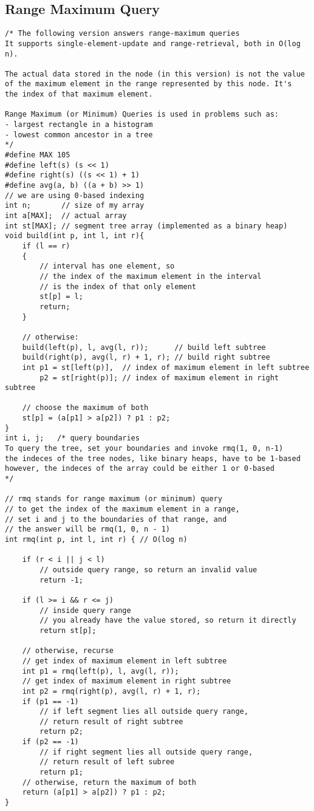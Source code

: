 \documentclass[12pt]{book}
\begin{document}
\subsection{Range Maximum Query}
\begin{verbatim}
/* The following version answers range-maximum queries
It supports single-element-update and range-retrieval, both in O(log n).

The actual data stored in the node (in this version) is not the value
of the maximum element in the range represented by this node. It's
the index of that maximum element.

Range Maximum (or Minimum) Queries is used in problems such as:
- largest rectangle in a histogram
- lowest common ancestor in a tree
*/
#define MAX 105
#define left(s) (s << 1)
#define right(s) ((s << 1) + 1)
#define avg(a, b) ((a + b) >> 1)
// we are using 0-based indexing
int n;       // size of my array
int a[MAX];  // actual array
int st[MAX]; // segment tree array (implemented as a binary heap)
void build(int p, int l, int r){
	if (l == r)
	{
		// interval has one element, so
		// the index of the maximum element in the interval
		// is the index of that only element
		st[p] = l;
		return;
	}
	
	// otherwise:
	build(left(p), l, avg(l, r));      // build left subtree
	build(right(p), avg(l, r) + 1, r); // build right subtree
	int p1 = st[left(p)],  // index of maximum element in left subtree
	    p2 = st[right(p)]; // index of maximum element in right subtree
	
	// choose the maximum of both
	st[p] = (a[p1] > a[p2]) ? p1 : p2;
}
int i, j;	/* query boundaries
To query the tree, set your boundaries and invoke rmq(1, 0, n-1)
the indeces of the tree nodes, like binary heaps, have to be 1-based
however, the indeces of the array could be either 1 or 0-based
*/

// rmq stands for range maximum (or minimum) query
// to get the index of the maximum element in a range,
// set i and j to the boundaries of that range, and
// the answer will be rmq(1, 0, n - 1)
int rmq(int p, int l, int r) { // O(log n)

	if (r < i || j < l)
		// outside query range, so return an invalid value
		return -1;

	if (l >= i && r <= j)
		// inside query range
		// you already have the value stored, so return it directly
		return st[p];
		
	// otherwise, recurse
	// get index of maximum element in left subtree
	int p1 = rmq(left(p), l, avg(l, r));
	// get index of maximum element in right subtree
	int p2 = rmq(right(p), avg(l, r) + 1, r);
	if (p1 == -1)
		// if left segment lies all outside query range,
		// return result of right subtree
		return p2;
	if (p2 == -1)
		// if right segment lies all outside query range,
		// return result of left subree
		return p1;
	// otherwise, return the maximum of both
	return (a[p1] > a[p2]) ? p1 : p2;
}


\end{verbatim}
\end{document}
